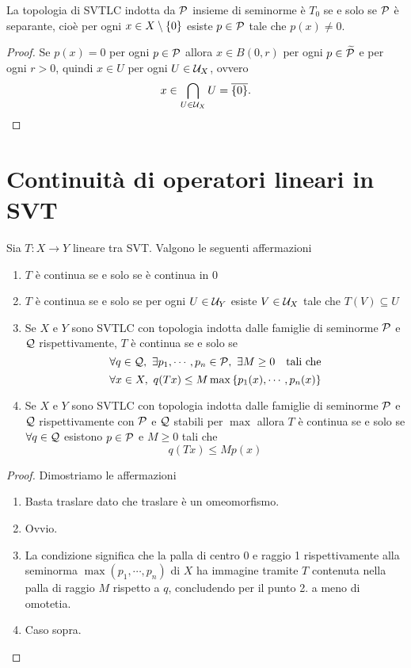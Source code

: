 \begin{proposition}
La topologia di SVTLC indotta da $\mathcal{P}$ insieme di seminorme \`e $T_0$ se e solo se $\mathcal{P}$ \`e separante, cio\`e per ogni $x\in X\setminus\{0\}$ esiste $p\in\mathcal{P}$ tale che $p(x)\neq 0$.
\end{proposition}
\begin{proof}
Se $p(x)=0$ per ogni $p\in\mathcal{P}$ allora $x\in B(0,r)$ per ogni $p\in\widetilde{\mathcal{P}}$ e per ogni $r>0$, quindi $x\in U$ per ogni $U\in\mathcal{U}_X$, ovvero
\[x\in \bigcap_{U\in\mathcal{U}_X}U=\overline{\left\{{0}\right\}}.\]
\end{proof}


\section{Continuit\`a di operatori lineari in SVT}
\begin{proposition}\label{PrContinuitaLineariSVT}
Sia $T:X\to Y$ lineare tra SVT. Valgono le seguenti affermazioni
\begin{enumerate}
    \item $T$ \`e continua se e solo se \`e continua in $0$
    \item $T$ \`e continua se e solo se per ogni $U\in \mathcal{U}_Y$ esiste $V\in \mathcal{U}_X$ tale che $T(V)\subseteq U$
    \item Se $X$ e $Y$ sono SVTLC con topologia indotta dalle famiglie di seminorme $\mathcal{P}$ e $\mathcal{Q}$ rispettivamente, $T$ \`e continua se e solo se
    \[\forall q\in \Qc,\ \exists p_1,\cdots, p_n\in \Pc,\ \exists M\geq 0\quad\text{tali che}\]
    \[\forall x\in X,\ q(Tx)\leq M\max\left\{{p_1(x),\cdots,p_n(x)}\right\}\]
    \item Se $X$ e $Y$ sono SVTLC con topologia indotta dalle famiglie di seminorme $\mathcal{P}$ e $\mathcal{Q}$ rispettivamente con $\mathcal{P}$ e $\mathcal{Q}$ stabili per $\max$ allora $T$ \`e continua se e solo se $\forall q\in\mathcal{Q}$ esistono $p\in\mathcal{P}$ e $M\geq 0$ tali che
    \[q(Tx)\leq Mp(x)\]
\end{enumerate}
\end{proposition}
\begin{proof}
Dimostriamo le affermazioni
\begin{enumerate}
    \item Basta traslare dato che traslare \`e un omeomorfismo.
    \item Ovvio.
    \item La condizione significa che la palla di centro $0$ e raggio 1 rispettivamente alla seminorma $\max(p_1,\cdots, p_n)$ di $X$ ha immagine tramite $T$ contenuta nella palla di raggio $M$ rispetto a $q$, concludendo per il punto 2. a meno di omotetia.
    \item Caso sopra.
\end{enumerate}
\end{proof}

